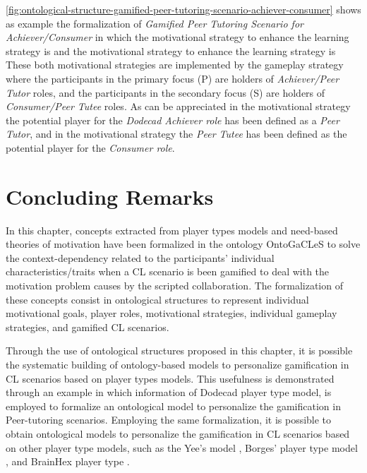 \autoref{fig:ontological-structure-gamified-peer-tutoring-scenario-achiever-consumer} shows as example the formalization of \emph{Gamified Peer Tutoring Scenario for Achiever/Consumer} in which the motivational strategy to enhance the learning strategy  is  and the motivational strategy to enhance the learning strategy  is  These both motivational strategies are implemented by the gameplay strategy  where the participants in the primary focus (P) are holders of \emph{Achiever/Peer Tutor} roles, and the participants in the secondary focus (S) are holders of \emph{Consumer/Peer Tutee} roles. As can be appreciated in the motivational strategy  the potential player for the \emph{Dodecad Achiever role} has been defined as a \emph{Peer Tutor}, and in the motivational strategy  the \emph{Peer Tutee} has been defined as the potential player for the \emph{Consumer role}.



\section{Concluding Remarks}
\label{sec:concluding-remarks}

In this chapter, concepts extracted from player types models and need-based theories of motivation have been formalized in the ontology OntoGaCLeS to solve the context-dependency related to the participants' individual characteristics/traits when a CL scenario is been gamified to deal with the motivation problem causes by the scripted collaboration. The formalization of these concepts consist in ontological structures to represent individual motivational goals, player roles, motivational strategies, individual gameplay strategies, and gamified CL scenarios.

Through the use of ontological structures proposed in this chapter, it is possible the systematic building of ontology-based models to personalize gamification in CL scenarios based on player types models. This usefulness is demonstrated through an example in which information of Dodecad player type model, is employed to formalize an ontological model to personalize the gamification in Peer-tutoring scenarios. Employing the same formalization, it is possible to obtain ontological models to personalize the gamification in CL scenarios based on other player type models, such as the Yee's model \cite{Yee2006}, Borges' player type model \cite{BorgesMizoguchiDurelliBittencourtIsotani2016}, and BrainHex player type \cite{NackeBatemanMandryk2014}.

